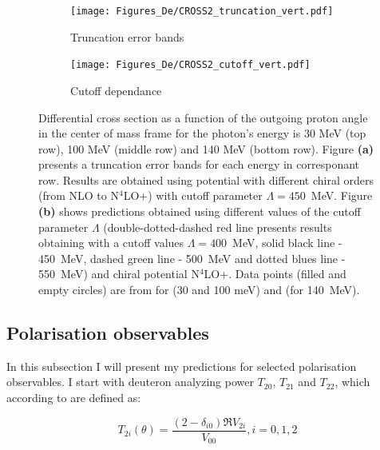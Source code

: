     \begin{figure}[h]
        \centering
        \begin{subfigure}[b]{0.46\textwidth}
            \texttt{[image: Figures\_De/CROSS2\_truncation\_vert.pdf]}
            \caption{Truncation error bands}
            \label{Diff_cross_truncation}
        \end{subfigure}
        \begin{subfigure}[b]{0.46\textwidth}
            \texttt{[image: Figures\_De/CROSS2\_cutoff\_vert.pdf]}
            \caption{Cutoff dependance}
            \label{Diff_cross_cutoff}
        \end{subfigure}
        \caption{Differential cross section as a function of the outgoing proton angle in the center of mass frame 
        for the photon's energy is 30 MeV (top row), 100 MeV (middle row) and 140 MeV (bottom row).
        Figure {\bf(a)} presents a truncation error bands for each energy in corresponant row. 
        Results are obtained using potential with different chiral orders (from NLO to N$^4$LO+) 
        with cutoff parameter $\Lambda=450$~MeV.
        Figure {\bf (b)} shows predictions obtained using different values of the cutoff parameter $\Lambda$
        (double-dotted-dashed red line presents results obtaining with 
        a cutoff values $\Lambda=400$~MeV, solid black line - 450~MeV, dashed green line - 500~MeV
        and dotted blues line - 550~MeV) and chiral potential N$^4$LO+. 
        Data points (filled and empty circles) are from \cite{Ying_Experiment_Deut}
        for (30 and 100 meV)
        and \cite{DeSanctis_Experiment_Deut} (for 140~MeV).}
    \end{figure}


    \clearpage

    \subsection{Polarisation observables}
    \label{tensor_results}

    In this subsection I will present my predictions for 
    selected polarisation observables.
    I start with deuteron analyzing power $T_{20}$, $T_{21}$ and $T_{22}$,
    which according to \cite{ArenhovelPhotodisint1991} are defined as:
    
    \begin{equation}
        T_{2i} (\theta) = \frac{(2 - \delta_{i0}) \Re V_{2i}}{V_{00}}, i=0,1,2
    \end{equation}

